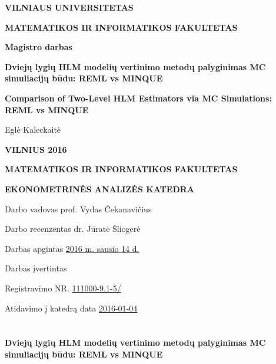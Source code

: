 \documentclass[11pt,a4paper]{article}
\begin{document}
\begin{titlepage}
\vskip 20pt
\centerline{\bf \large VILNIAUS UNIVERSITETAS}
\bigskip
\centerline{\large \textbf{MATEMATIKOS IR INFORMATIKOS FAKULTETAS}}

\vskip 120pt
\centerline{\bf \Large \textbf{Magistro darbas}}
\vskip 50pt
\begin{center}
{\bf \LARGE Dviejų lygių HLM modelių vertinimo metodų palyginimas MC simuliacijų būdu: REML vs MINQUE}
\end{center}
\bigskip
\begin{center}
{\bf \Large Comparison of Two-Level HLM Estimators via MC Simulations: REML vs MINQUE}
\end{center}
\bigskip
\centerline{\Large Eglė Kaleckaitė}
\vskip 90pt
\vskip 120pt
\centerline{\large \textbf{VILNIUS 2016}}
\end{titlepage}
\begin{titlepage}
\centerline {\bf \large MATEMATIKOS IR INFORMATIKOS FAKULTETAS}
\centerline {\bf EKONOMETRINĖS ANALIZĖS KATEDRA}


\vskip 120pt
\large Darbo vadovas prof. Vydas Čekanavičius

\large Darbo recenzentas dr. Jūratė Šliogerė
\vskip 150pt

{\large Darbas apgintas \underline{ 2016 m. sausio  14   d. }}

\large Darbas įvertintas \underline{\hskip 132pt }

\vskip 120pt

{\large Registravimo NR. \underline{111000-9.1-5/\hskip 50pt }

Atidavimo į katedrą data \underline{2016-01-04\hskip 23pt} }

\end{titlepage}

\newpage
{}
\section*{}%

\begin{center}{\large\textbf{Dviejų lygių HLM modelių vertinimo metodų palyginimas MC simuliacijų būdu: REML vs MINQUE}}\end{center}
\end{document}
